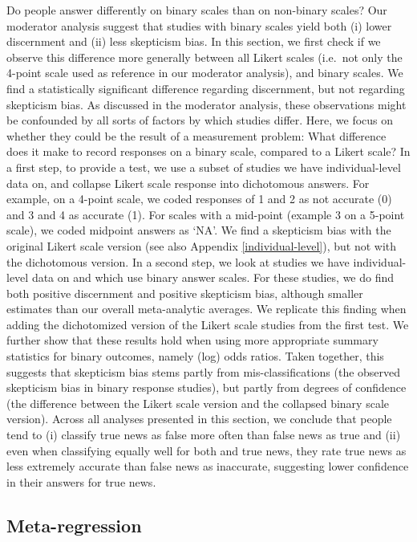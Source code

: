\documentclass[
  man]{apa6}
\begin{document}
Do people answer differently on binary scales than on non-binary scales? Our moderator analysis suggest that studies with binary scales yield both (i) lower discernment and (ii) less skepticism bias. In this section, we first check if we observe this difference more generally between all Likert scales (i.e.~not only the 4-point scale used as reference in our moderator analysis), and binary scales. We find a statistically significant difference regarding discernment, but not regarding skepticism bias. As discussed in the moderator analysis, these observations might be confounded by all sorts of factors by which studies differ. Here, we focus on whether they could be the result of a measurement problem: What difference does it make to record responses on a binary scale, compared to a Likert scale? In a first step, to provide a test, we use a subset of studies we have individual-level data on, and collapse Likert scale response into dichotomous answers. For example, on a 4-point scale, we coded responses of 1 and 2 as not accurate (0) and 3 and 4 as accurate (1). For scales with a mid-point (example 3 on a 5-point scale), we coded midpoint answers as `NA'. We find a skepticism bias with the original Likert scale version (see also Appendix \ref{individual-level}), but not with the dichotomous version. In a second step, we look at studies we have individual-level data on and which use binary answer scales. For these studies, we do find both positive discernment and positive skepticism bias, although smaller estimates than our overall meta-analytic averages. We replicate this finding when adding the dichotomized version of the Likert scale studies from the first test. We further show that these results hold when using more appropriate summary statistics for binary outcomes, namely (log) odds ratios. Taken together, this suggests that skepticism bias stems partly from mis-classifications (the observed skepticism bias in binary response studies), but partly from degrees of confidence (the difference between the Likert scale version and the collapsed binary scale version). Across all analyses presented in this section, we conclude that people tend to (i) classify true news as false more often than false news as true and (ii) even when classifying equally well for both and true news, they rate true news as less extremely accurate than false news as inaccurate, suggesting lower confidence in their answers for true news.

\subsection{Meta-regression}\label{meta-regression}
\end{document}
